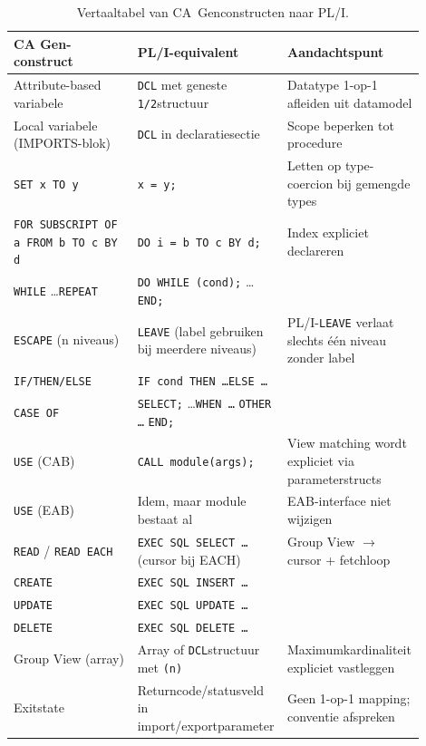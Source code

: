 \begin{table}[h]
\centering
\caption[Vertaaltabel CA~Gen $\rightarrow$ PL/I]{Vertaaltabel van CA~Gen\-constructen naar PL/I.}
\label{tab:vertaaltabel}
\small
\begin{tabular}{|p{0.30\linewidth}|p{0.30\linewidth}|p{0.30\linewidth}|}
\hline
\textbf{CA Gen-construct} & \textbf{PL/I-equivalent} & \textbf{Aandachtspunt} \\
\hline
Attribute-based variabele & \texttt{DCL} met geneste \texttt{1/2}\-structuur & Datatype 1-op-1 afleiden uit datamodel \\
\hline
Local variabele (IMPORTS-blok) & \texttt{DCL} in declaratiesectie & Scope beperken tot procedure \\
\hline
\texttt{SET x TO y} & \texttt{x = y;} & Letten op type-coercion bij gemengde types \\
\hline
\texttt{FOR SUBSCRIPT OF a FROM b TO c BY d} & \texttt{DO i = b TO c BY d;} & Index expliciet declareren \\
\hline
\texttt{WHILE} \dots \texttt{REPEAT} & \texttt{DO WHILE (cond);} \dots \texttt{END;} & \\
\hline
\texttt{ESCAPE} (n niveaus) & \texttt{LEAVE} (label gebruiken bij meerdere niveaus) & PL/I-\texttt{LEAVE} verlaat slechts één niveau zonder label \\
\hline
\texttt{IF/THEN/ELSE} & \texttt{IF cond THEN \dots ELSE \dots} & \\
\hline
\texttt{CASE OF} & \texttt{SELECT;} \dots \texttt{WHEN \dots} \texttt{OTHER \dots} \texttt{END;} & \\
\hline
\texttt{USE} (CAB) & \texttt{CALL module(args);} & View matching wordt expliciet via parameterstructs \\
\hline
\texttt{USE} (EAB) & Idem, maar module bestaat al & EAB-interface niet wijzigen \\
\hline
\texttt{READ} / \texttt{READ EACH} & \texttt{EXEC SQL SELECT \dots} (cursor bij EACH) & Group View $\rightarrow$ cursor + fetch\-loop \\
\hline
\texttt{CREATE} & \texttt{EXEC SQL INSERT \dots} & \\
\hline
\texttt{UPDATE} & \texttt{EXEC SQL UPDATE \dots} & \\
\hline
\texttt{DELETE} & \texttt{EXEC SQL DELETE \dots} & \\
\hline
Group View (array) & Array of \texttt{DCL}\-structuur met \texttt{(n)} & Maximumkardinaliteit expliciet vastleggen \\
\hline
Exitstate & Return\-code/status\-veld in import\-/exportparameter & Geen 1-op-1 mapping; conventie afspreken \\
\hline
\end{tabular}
\end{table}


